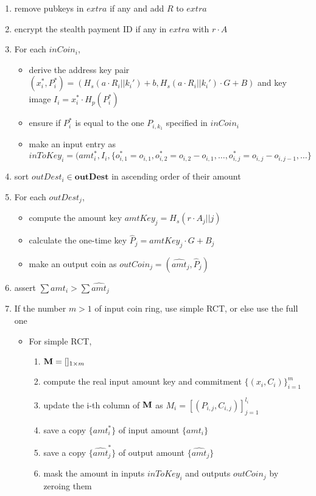 \begin{description}
\begin{enumerate}
				\item remove pubkeys in \(extra\) if any and add \(R\) to \(extra\)
				\item encrypt the stealth payment ID if any in \(extra\) with \(r\cdot A\)
				\item For each \(inCoin_i\),
					\begin{itemize}
						\item derive the address key pair \( (x_i^*,P_i^*)=(H_s(a\cdot R_i||k_i')+b, H_s(a\cdot R_i||k_i')\cdot G+B)\) and key image \(I_i=x_i^*\cdot H_p(P_i^*)\)
						\item ensure if \(P_i^*\) is equal to the one \(P_{i,k_1}\) specified in \(inCoin_i\)
						\item make an input entry as \( inToKey_i=(amt_i^*,I_i,\{o_{i,1}^*=o_{i,1},o_{i,2}^*=o_{i,2}-o_{i,1},\dots,o_{i,j}^*=o_{i,j}-o_{i,j-1},\dots\}\)
					\end{itemize}
				\item sort \(outDest_i\in\mathbf{outDest}\) in ascending order of their amount
				\item For each \(outDest_j\), 
					\begin{itemize}
						\item compute the amount key \(amtKey_j=H_s(r\cdot A_j||j)\)
						\item calculate the one-time key \(\hat{P}_j=amtKey_j\cdot G+B_j\)
						\item make an output coin as \(outCoin_j=(\hat{amt}_j,\hat{P}_j)\)
					\end{itemize}
				\item assert \(\sum amt_i>\sum\hat{amt}_j\)
				\item If the number \(m>1\) of input coin ring, use simple RCT, or else use the full one
					\begin{itemize}
						\item For simple RCT,
							\begin{enumerate}
								\item \(\mathbf{M}=[]_{1\times m}\)
								\item compute the real input amount key and commitment \(\{(x_i,C_i)\}_{i=1}^m\)
								\item update the i-th column of \(\mathbf{M}\) as \(M_i=[(P_{i,j},C_{i,j})]_{j=1}^{l_i}\)
								\item save a copy \(\{amt_i^*\}\) of input amount \(\{amt_i\}\)
								\item save a copy \(\{\hat{amt}_j^*\}\) of output amount \(\{\hat{amt}_j\}\)
								\item mask the amount in inputs \(inToKey_i\) and outputs \(outCoin_j\) by zeroing them

\end{enumerate}
\end{itemize}
\end{enumerate}
\end{description}
